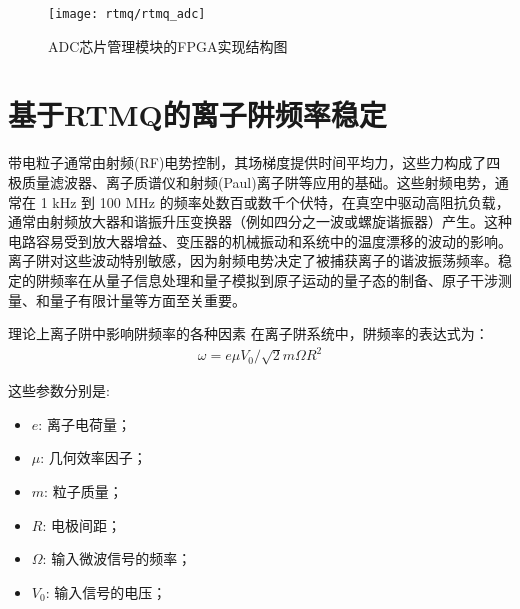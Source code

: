\begin{figure}
    \centering
    \caption[ADC芯片管理模块的FPGA实现结构图]{ADC芯片管理模块的FPGA实现结构图\label{fig:rtmq_adc}}
    \texttt{[image: rtmq/rtmq\_adc]}
\end{figure}






\newpage
\section[基于RTMQ的离子阱频率稳定]{基于RTMQ的离子阱频率稳定\label{section:trap_frequency_stablization}}

带电粒子通常由射频(RF)电势控制，其场梯度提供时间平均力，这些力构成了四极质量滤波器、离子质谱仪和射频(Paul)离子阱等应用的基础\cite[]{Dehmelt_1990, Paul_1990}。这些射频电势，通常在 1 kHz 到 100 MHz 的频率处数百或数千个伏特，在真空中驱动高阻抗负载，通常由射频放大器和谐振升压变换器（例如四分之一波或螺旋谐振器）产生\cite[]{Siverns_Simkins_Weidt_Hensinger_2012}。这种电路容易受到放大器增益、变压器的机械振动和系统中的温度漂移的波动的影响。离子阱对这些波动特别敏感，因为射频电势决定了被捕获离子的谐波振荡频率。稳定的阱频率在从量子信息处理\cite[]{Blatt_Wineland_2008, Monroe_Kim_2013}和量子模拟\cite[]{Richerme_Gong_Lee_Senko_Smith_Foss_Feig_Michalakis_Gorshkov_Monroe_2014, Jurcevic_Lanyon_Hauke_Hempel_Zoller_Blatt_Roos_2014}到原子运动的量子态的制备\cite[]{Leibfried_Blatt_Monroe_Wineland_2003}、原子干涉测量\cite[]{Johnson_Neyenhuis_Mizrahi_Wong_Campos_Monroe_2015}、和量子有限计量\cite[]{Chou_Hume_Koelemeij_Wineland_Rosenband_2010}等方面至关重要。


理论上离子阱中影响阱频率的各种因素
在离子阱系统中，阱频率的表达式为：
\begin{align}
    \omega=e\mu V_0/\sqrt{2}m\Omega R^2
\end{align}

这些参数分别是:
\begin{itemize}
    \item $e$: 离子电荷量；
    \item $\mu$: 几何效率因子；
    \item $m$: 粒子质量；
    \item $R$: 电极间距；
    \item $\Omega$: 输入微波信号的频率；
    \item $V_0$: 输入信号的电压；
\end{itemize}


